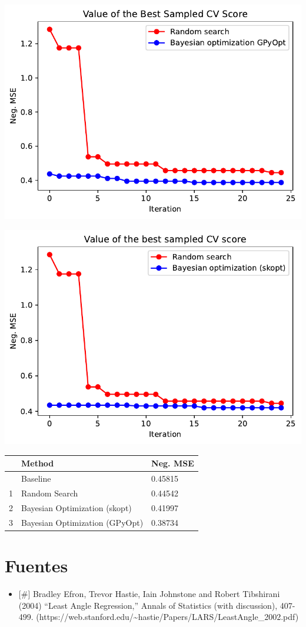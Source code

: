 \documentclass[
  12pt,
  letterpaper,
  DIV=11,
  numbers=noendperiod]{scrartcl}
\providecommand{\tightlist}{%
  \setlength{\itemsep}{0pt}\setlength{\parskip}{0pt}}\usepackage{longtable,booktabs,array}
\begin{document}
\includegraphics{ProyFinal_OptBayesiana_2024_files/figure-pdf/cell-23-output-1.pdf}

\includegraphics{ProyFinal_OptBayesiana_2024_files/figure-pdf/cell-24-output-1.pdf}

\begin{longtable}[]{@{}lll@{}}
\toprule\noalign{}
& Method & Neg. MSE \\
\midrule\noalign{}
\endhead
\bottomrule\noalign{}
\endlastfoot
0 & Baseline & 0.45815 \\
1 & Random Search & 0.44542 \\
2 & Bayesian Optimization (skopt) & 0.41997 \\
3 & Bayesian Optimization (GPyOpt) & 0.38734 \\
\end{longtable}

\section{Fuentes}\label{fuentes}

\begin{itemize}
\tightlist
\item
  {[}\#{]} Bradley Efron, Trevor Hastie, Iain Johnstone and Robert
  Tibshirani (2004) ``Least Angle Regression,'' Annals of Statistics
  (with discussion), 407-499.
  (https://web.stanford.edu/\textasciitilde hastie/Papers/LARS/LeastAngle\_2002.pdf)
\end{itemize}
\end{document}
